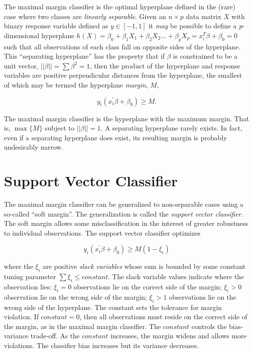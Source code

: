 \documentclass[
]{book}
\begin{document}
The maximal margin classifier is the optimal hyperplane defined in the (rare) case where two classes are \emph{linearly separable}. Given an \(n \times p\) data matrix \(X\) with binary response variable defined as \(y \in [-1, 1]\) it \emph{may} be possible to define a \emph{p}-dimensional hyperplane \(h(X) = \beta_0 + \beta_1X_1 + \beta_2X_2 \dots + \beta_pX_p = x_i^T \beta + \beta_0 = 0\) such that all observations of each class fall on opposite sides of the hyperplane. This ``separating hyperplane'' has the property that if \(\beta\) is constrained to be a unit vector, \(||\beta|| = \sum\beta^2 = 1\), then the product of the hyperplane and response variables are positive perpendicular distances from the hyperplane, the smallest of which may be termed the hyperplane \emph{margin}, \(M\),

\[y_i (x_i^{'} \beta + \beta_0) \ge M.\]

The maximal margin classifier is the hyperplane with the maximum margin. That is, \(\max \{M\}\) subject to \(||\beta|| = 1\). A separating hyperplane rarely exists. In fact, even if a separating hyperplane does exist, its resulting margin is probably undesirably narrow.

\hypertarget{support-vector-classifier}{%
\section{Support Vector Classifier}\label{support-vector-classifier}}

The maximal margin classifier can be generalized to non-separable cases using a so-called ``soft margin''. The generalization is called the \emph{support vector classifier}. The soft margin allows some misclassification in the interest of greater robustness to individual observations. The support vector classifier optimizes

\[y_i (x_i^{'} \beta + \beta_0) \ge M(1 - \xi_i)\]

where the \(\xi_i\) are positive \emph{slack variables} whose sum is bounded by some constant tuning parameter \(\sum{\xi_i} \le constant\). The slack variable values indicate where the observation lies: \(\xi_i = 0\) observations lie on the correct side of the margin; \(\xi_i > 0\) observation lie on the wrong side of the margin; \(\xi_i > 1\) observations lie on the wrong side of the hyperplane. The constant sets the tolerance for margin violation. If \(constant = 0\), then all observations must reside on the correct side of the margin, as in the maximal margin classifier. The \(constant\) controls the bias-variance trade-off. As the \(constant\) increases, the margin widens and allows more violations. The classifier bias increases but its variance decreases.
\end{document}
